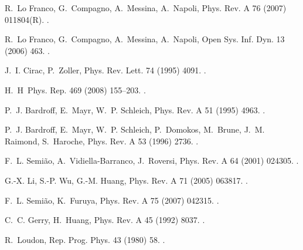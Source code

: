 \documentclass[twocolumn,3p,times]{elsarticle}
\begin{document}
\begin{thebibliography}{10}
R.~{Lo Franco}, G.~Compagno, A.~Messina, A.~Napoli, Phys. Rev. A 76 (2007)
  011804(R).
\newblock \href {http://dx.doi.org/10.1103/PhysRevA.76.011804}
  {}.

R.~{Lo Franco}, G.~Compagno, A.~Messina, A.~Napoli, Open Sys. Inf. Dyn. 13
  (2006) 463.
\newblock \href {http://dx.doi.org/10.1007/s11080-006-9016-0}
  {}.

J.~I. Cirac, P.~Zoller, Phys. Rev. Lett. 74 (1995) 4091.
\newblock \href {http://dx.doi.org/10.1103/PhysRevLett.74.4091}
  {}.

H.~H\, Phys. Rep. 469 (2008) 155--203.
\newblock \href {http://dx.doi.org/10.1016/j.physrep.2008.09.003}
  {}.

P.~J. Bardroff, E.~Mayr, W.~P. Schleich, Phys. Rev. A 51 (1995) 4963.
\newblock \href {http://dx.doi.org/10.1103/PhysRevA.51.4963}
  {}.

P.~J. Bardroff, E.~Mayr, W.~P. Schleich, P.~Domokos, M.~Brune, J.~M. Raimond,
  S.~Haroche, Phys. Rev. A 53 (1996) 2736.
\newblock \href {http://dx.doi.org/10.1103/PhysRevA.53.2736}
  {}.

F.~L. Semi{\~{a}}o, A.~Vidiella-Barranco, J.~Roversi, Phys. Rev. A 64 (2001)
  024305.
\newblock \href {http://dx.doi.org/10.1103/PhysRevA.64.024305}
  {}.

G.-X. Li, S.-P. Wu, G.-M. Huang, Phys. Rev. A 71 (2005) 063817.
\newblock \href {http://dx.doi.org/10.1103/PhysRevA.71.063817}
  {}.

F.~L. Semi{\~{a}}o, K.~Furuya, Phys. Rev. A 75 (2007) 042315.
\newblock \href {http://dx.doi.org/10.1103/PhysRevA.75.042315}
  {}.

C.~C. Gerry, H.~Huang, Phys. Rev. A 45 (1992) 8037.
\newblock \href {http://dx.doi.org/10.1103/PhysRevA.45.8037}
  {}.

R.~Loudon, Rep. Prog. Phys. 43 (1980) 58.
\newblock \href {http://dx.doi.org/10.1088/0034-4885/43/7/002}
  {}.


\end{thebibliography}
\end{document}
